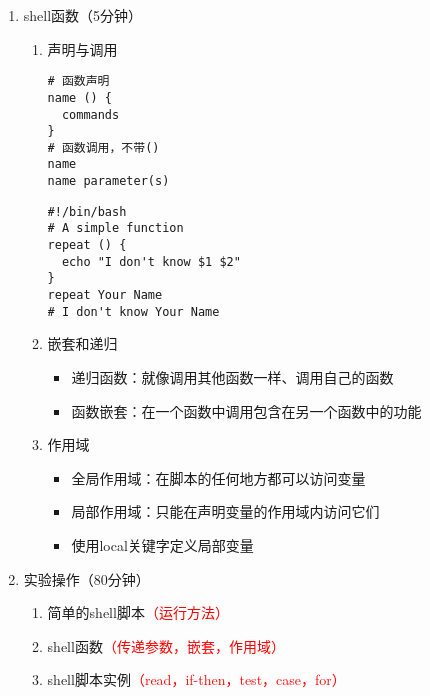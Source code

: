 \documentclass{TIJMUjiaoanSY}
\begin{document}
\begin{enumerate}
  \item shell函数（5分钟）
    \begin{enumerate}
      \item 声明与调用
	\vspace*{-10pt}
	\begin{multicols}{2}
\begin{verbatim}
# 函数声明
name () {
  commands
}
# 函数调用，不带()
name
name parameter(s)
\end{verbatim}
\begin{verbatim}
#!/bin/bash
# A simple function
repeat () {
  echo "I don't know $1 $2"
}
repeat Your Name
# I don't know Your Name
\end{verbatim}
	\end{multicols}
	\vspace*{-10pt}
      \item 嵌套和递归
	\begin{itemize}
	  \item 递归函数：就像调用其他函数一样、调用自己的函数
	  \item 函数嵌套：在一个函数中调用包含在另一个函数中的功能
	\end{itemize}
      \item 作用域
	\begin{itemize}
	  \item 全局作用域：在脚本的任何地方都可以访问变量
	  \item 局部作用域：只能在声明变量的作用域内访问它们
	  \item 使用local关键字定义局部变量
	\end{itemize}
    \end{enumerate}

  \item 实验操作（80分钟）
    \begin{enumerate}
      \item 简单的shell脚本\textcolor{red}{（运行方法）}
      \item shell函数\textcolor{red}{（传递参数，嵌套，作用域）}
      \item shell脚本实例\textcolor{red}{（read，if-then，test，case，for）}
    \end{enumerate}

\end{enumerate}

\otherTail
\end{document}
